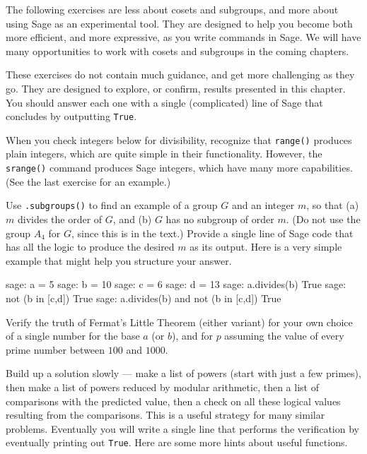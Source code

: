 The following exercises are less about cosets and subgroups, and more about using Sage as an experimental tool.  They are designed to help you become both more efficient, and more expressive, as you write commands in Sage.  We will have many opportunities to work with cosets and subgroups in the coming chapters.\par
%
These exercises do not contain much guidance, and get more challenging as they go.  They are designed to explore, or confirm, results presented in this chapter.  You should answer each one with a single (complicated) line of Sage that concludes by outputting \verb?True?.\par
%
When you check integers below for divisibility, recognize that \verb?range()? produces plain integers, which are quite simple in their functionality.  However, the \verb?srange()? command produces Sage integers, which have many more capabilities.  (See the last exercise for an example.)
\begin{sageverbatim}\end{sageverbatim}
%
%
Use \verb?.subgroups()? to find an example of a group $G$ and an integer $m$, so that (a) $m$ divides the order of $G$, and (b) $G$ has no subgroup of order $m$.  (Do not use the group $A_4$ for $G$, since this is in the text.)  Provide a single line of Sage code that has all the logic to produce the desired $m$ as its output.  Here is a very simple example that might help you structure your answer.
%
\begin{sageexample}
sage: a = 5
sage: b = 10
sage: c = 6
sage: d = 13
sage: a.divides(b)
True
sage: not (b in [c,d])
True
sage: a.divides(b) and not (b in [c,d])
True
\end{sageexample}
%
\begin{sageverbatim}\end{sageverbatim}
%
%
Verify the truth of Fermat's Little Theorem (either variant) for your own choice of a single number for the base $a$ (or $b$), and for $p$ assuming the value of every prime number between $100$ and $1000$.\par
%
Build up a solution slowly --- make a list of powers (start with just a few primes), then make a list of powers reduced by modular arithmetic, then a list of comparisons with  the predicted value, then a check on all these logical values resulting from the comparisons.  This is a useful strategy for many similar problems.  Eventually you will write a single line that performs the verification by eventually printing out \verb?True?.  Here are some more hints about useful functions.
